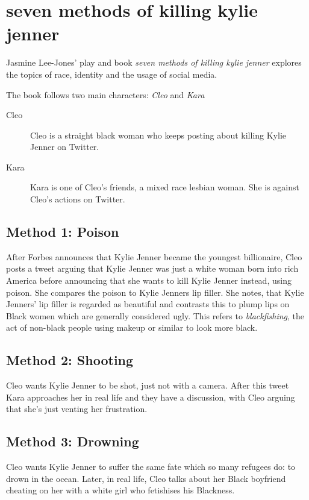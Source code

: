 \documentclass{article}
\begin{document}
\section{seven methods of killing kylie jenner}
Jasmine Lee-Jones' play and book \textit{seven methods of killing kylie jenner} explores the topics of race, identity and the usage of social media.
 
The book follows two main characters: \emph{Cleo} and \emph{Kara}
\begin{description}
 \item[Cleo] Cleo is a straight black woman who keeps posting about killing Kylie Jenner on Twitter.
 \item[Kara] Kara is one of Cleo's friends, a mixed race lesbian woman. She is against Cleo's actions on Twitter. 
\end{description}
 
\subsection{Method 1: Poison} 
After Forbes announces that Kylie Jenner became the youngest  billionaire, Cleo posts a tweet arguing that Kylie Jenner was just a white woman born into rich America before announcing that she wants to kill Kylie Jenner instead, using poison. She compares the poison to Kylie Jenners lip filler. She notes, that Kylie Jenners' lip filler is regarded as beautiful and contrasts this to plump lips on Black women which are generally considered ugly. This refers to \emph{blackfishing}, the act of non-black people using makeup or similar to look more black. 
 
\subsection{Method 2: Shooting} 
Cleo wants Kylie Jenner to be shot, just not with a camera. After this tweet Kara approaches her in real life and they have a discussion, with Cleo arguing that she's just venting her frustration. 
 
\subsection{Method 3: Drowning}
Cleo wants Kylie Jenner to suffer the same fate which so many refugees do: to drown in the ocean. Later, in real life, Cleo talks about her Black boyfriend cheating on her with a white girl who fetishises his Blackness. 
 
\end{document}
